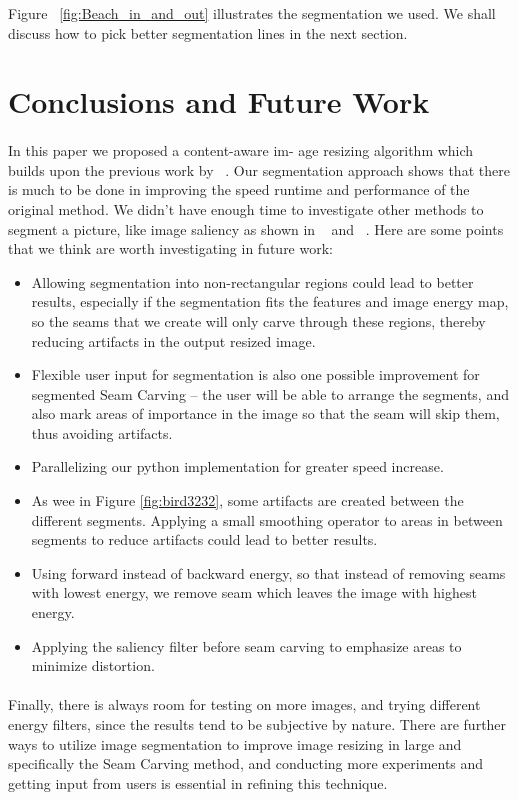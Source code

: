 \documentclass[conference]{acmsiggraph}
\begin{document}
Figure ~\ref{fig:Beach_in_and_out} illustrates the segmentation we used. We shall discuss how to pick better segmentation lines in the next section.


\section{Conclusions and Future Work}

\paragraph{}
In this paper we proposed a content-aware im-
age resizing algorithm which builds upon the previous work by ~\cite{Avidan2007}. Our segmentation approach shows that there is much to be done in improving the speed runtime and performance of the original method. We didn't have enough time to investigate other methods to segment a picture, like image saliency as shown in ~\cite{Liu2007} and ~\cite{Hasan2009}. Here are some points that we think are worth investigating in future work:

\begin{itemize}
  \item Allowing segmentation into non-rectangular regions could lead to better results, especially if the segmentation fits the features and image energy map, so the seams that we create will only carve through these regions, thereby reducing artifacts in the output resized image.
  \item Flexible user input for segmentation is also one possible improvement for segmented Seam Carving -- the user will be able to arrange the segments, and also mark areas of importance in the image so that the seam will skip them, thus avoiding  artifacts. 
  \item Parallelizing our python implementation for greater speed increase.
  \item As wee in Figure \ref{fig:bird3232}, some artifacts are created between the different segments. Applying a small smoothing operator to areas in between segments to reduce artifacts could lead to better results.
  \item Using forward instead of backward energy, so that instead of removing seams with lowest energy, we remove seam which leaves the image with highest energy.
  \item Applying the saliency filter before seam carving to emphasize areas to minimize distortion.  
\end{itemize}


\paragraph{}
Finally, there is always room for testing on more images, and trying different energy filters, since the results tend to be subjective by nature. There are further ways to utilize image segmentation to improve image resizing in large and specifically the Seam Carving method, and conducting more experiments and getting input from users is essential in refining this technique. 



\end{document}
